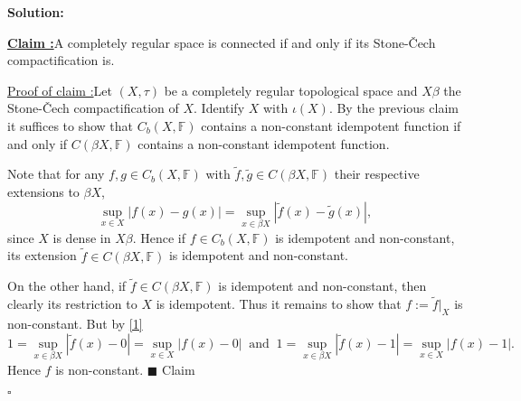 \documentclass[12pt]{article}
\newcounter{ProofCounter}
\newcounter{ClaimCounter}[ProofCounter]
\newenvironment{Solution}{\stepcounter{ProofCounter}\textbf{Solution:}}{\hfill$\square$}
\newenvironment{claim}[1]{\vspace{1mm}\stepcounter{ClaimCounter}\par\noindent\underline{\bf Claim \theClaimCounter:}\space#1}{}
\newenvironment{claimproof}[1]{\par\noindent\underline{Proof of claim \theClaimCounter:}\space#1}{\hfill $\blacksquare$ Claim \theClaimCounter}
\begin{document}
\begin{Solution}
\begin{enumerate}

      \begin{claim}
        A completely regular space is connected if and only if its Stone-\v{C}ech compactification is.
      \end{claim}
      \begin{claimproof}
        Let $(X, \tau)$ be a completely regular topological space and $X \beta$ the Stone-\v{C}ech compactification of $X$. Identify $X$ with $\iota(X)$.
        By the previous claim it suffices to show that $C_b(X, \mathbb{F})$ contains a non-constant idempotent function if and only if $C(\beta X,
        \mathbb{F})$ contains a non-constant idempotent function.

        Note that for any $f,g \in C_b(X, \mathbb{F})$ with $\tilde{f}, \tilde{g} \in C(\beta X, \mathbb{F})$ their respective extensions to $\beta X$,
        \begin{equation}
          \sup_{x \in X}|f(x) - g(x)| = \sup_{x \in \beta X}|\tilde{f}(x) - \tilde{g}(x)|,
          \label{1}
        \end{equation}
        since $X$ is dense in $X\beta$. Hence if $f \in C_b(X, \mathbb{F})$ is idempotent and non-constant, its extension $\tilde{f} \in C(\beta X, \mathbb{F})$
        is idempotent and non-constant. 
        
        On the other hand, if $\tilde{f} \in C(\beta X, \mathbb{F})$ is idempotent and non-constant, then clearly its restriction to
        $X$ is idempotent. Thus it remains to show that $f := \tilde{f}\big|_{X}$ is non-constant. But by \eqref{1} 
        \[
          1 = \sup_{x \in \beta X}|\tilde{f}(x) - 0| = \sup_{x \in X}|f(x) - 0|\  \text{ and } \
          1 = \sup_{x \in \beta X}|\tilde{f}(x) - 1| = \sup_{x \in X}|f(x) - 1|.
        \]
        Hence $f$ is non-constant.
      \end{claimproof}


\end{enumerate}
\end{Solution}
\end{document}
